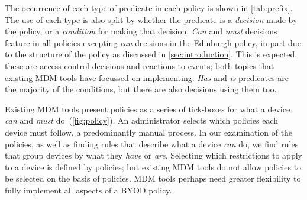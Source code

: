 \documentclass[conference,twocolumn]{IEEEtran}
\newcommand{\comment}[1]{}
\begin{document}
The occurrence of each type of predicate in each policy is shown in \autoref{tab:prefix}.
The use of each type is also split by whether the predicate is a \emph{decision} made by the policy, or a \emph{condition} for making that decision.
\emph{Can} and \emph{must} decisions feature in all policies excepting \emph{can} decisions in the Edinburgh policy, in part due to the structure of the policy as discussed in \autoref{sec:introduction}.
This is expected, these are access control decisions and reactions to events; both topics that existing MDM tools have focussed on implementing.
\emph{Has} and \emph{is} predicates are the majority of the conditions, but there are also decisions using them too.

\comment{
  This suggests that implementing a policy is more complex than choosing what a predefined group of devices can or cannot do.
  The groups themselves are defined by policy rules that can dynamically change based on the policy.
  Existing MDM tools, such as MaaS360, do not allow for policies to be applied based on the basis of policies.
}
Existing MDM tools present policies as a series of tick-boxes for what a device \emph{can} and \emph{must} do~(\autoref{fig:policy}).
An administrator selects which policies each device must follow, a predominantly manual process.
In our examination of the policies, as well as finding rules that describe what a device \emph{can} do, we find rules that group devices by what they \emph{have} or \emph{are}.
Selecting which restrictions to apply to a device is defined by policies; but existing MDM tools do not allow policies to be selected on the basis of policies.
MDM tools perhaps need greater flexibility to fully implement all aspects of a BYOD policy.
\end{document}
